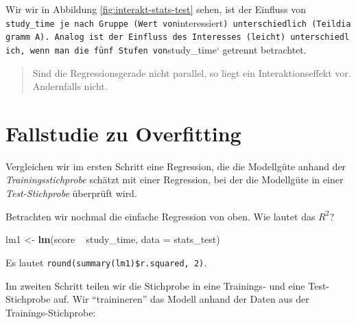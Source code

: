 \documentclass[12pt,ngerman,]{book}
\makeatletter
\newenvironment{Shaded}{\begin{snugshade}}{\end{snugshade}}
\newcommand{\KeywordTok}[1]{\textcolor[rgb]{0.13,0.29,0.53}{\textbf{{#1}}}}
\newcommand{\DataTypeTok}[1]{\textcolor[rgb]{0.13,0.29,0.53}{{#1}}}
\newcommand{\DecValTok}[1]{\textcolor[rgb]{0.00,0.00,0.81}{{#1}}}
\newcommand{\StringTok}[1]{\textcolor[rgb]{0.31,0.60,0.02}{{#1}}}
\newcommand{\CommentTok}[1]{\textcolor[rgb]{0.56,0.35,0.01}{\textit{{#1}}}}
\newcommand{\OtherTok}[1]{\textcolor[rgb]{0.56,0.35,0.01}{{#1}}}
\newcommand{\NormalTok}[1]{{#1}}
\newenvironment{kframe}{%
\medskip{}
\setlength{\fboxsep}{.8em}
 \def\at@end@of@kframe{}%
 \ifinner\ifhmode%
  \def\at@end@of@kframe{\end{minipage}}%
  \begin{minipage}{\columnwidth}%
 \fi\fi%
 \def\FrameCommand##1{\hskip\@totalleftmargin \hskip-\fboxsep
 \colorbox{shadecolor}{##1}\hskip-\fboxsep
     \hskip-\linewidth \hskip-\@totalleftmargin \hskip\columnwidth}%
 \MakeFramed {\advance\hsize-\width
   \@totalleftmargin\z@ \linewidth\hsize
   \@setminipage}}%
 {\par\unskip\endMakeFramed%
 \at@end@of@kframe}
\renewenvironment{Shaded}{\begin{kframe}}{\end{kframe}}
\theoremstyle{definition}
\theoremstyle{definition}
\theoremstyle{remark}
\makeatother
\begin{document}
Wir wir in Abbildung \ref{fig:interakt-stats-test} sehen, ist der
Einfluss von
\texttt{study\_time\textquotesingle{}\ je\ nach\ Gruppe\ (Wert\ von}interessiert\texttt{)\ unterschiedlich\ (Teildiagramm\ A).\ Analog\ ist\ der\ Einfluss\ des\ Interesses\ (leicht)\ unterschiedlich,\ wenn\ man\ die\ fünf\ Stufen\ von}study\_time`
getrennt betrachtet.

\begin{quote}
Sind die Regressionsgerade nicht parallel, so liegt ein
Interaktionseffekt vor. Andernfalls nicht.
\end{quote}

\section{Fallstudie zu Overfitting}\label{overfitting-casestudy}

Vergleichen wir im ersten Schritt eine Regression, die die Modellgüte
anhand der \emph{Trainingsstichprobe} schätzt mit einer Regression, bei
der die Modellgüte in einer \emph{Test-Stichprobe} überprüft wird.

Betrachten wir nochmal die einfache Regression von oben. Wie lautet das
\(R^2\)?

\begin{Shaded}
\begin{Highlighting}[]

\NormalTok{lm1 <-}\StringTok{ }\KeywordTok{lm}\NormalTok{(score ~}\StringTok{ }\NormalTok{study_time, }\DataTypeTok{data =} \NormalTok{stats_test)}
\end{Highlighting}
\end{Shaded}

Es lautet \texttt{round(summary(lm1)\$r.squared,\ 2)}.

Im zweiten Schritt teilen wir die Stichprobe in eine Trainings- und eine
Test-Stichprobe auf. Wir ``trainineren'' das Modell anhand der Daten aus
der Trainings-Stichprobe:

\begin{Shaded}
\end{Shaded}
\end{document}
